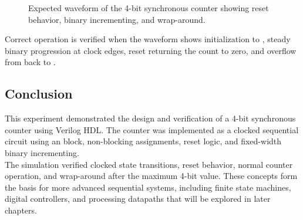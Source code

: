 \begin{figure}[H]
    \centering
    \caption{Expected waveform of the 4-bit synchronous counter showing reset behavior, binary incrementing, and wrap-around.}
    \label{fig:synchronous_counter_waveform}
\end{figure}

\noindent Correct operation is verified when the waveform shows initialization to
, steady binary progression at clock edges, reset returning the count to zero, and
overflow from  back to .

\subsection{Conclusion}
This experiment demonstrated the design and verification of a 4-bit synchronous counter using
Verilog HDL. The counter was implemented as a clocked sequential circuit using an
 block, non-blocking assignments, reset logic, and fixed-width
binary incrementing.\\

\noindent The simulation verified clocked state transitions, reset behavior, normal counter
operation, and wrap-around after the maximum 4-bit value. These concepts form the basis for more
advanced sequential systems, including finite state machines, digital controllers, and processing
datapaths that will be explored in later chapters.
